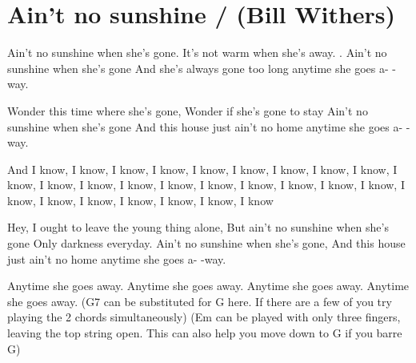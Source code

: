 \section{Ain't no sunshine / (Bill Withers)}\label{sec:ain_t_no_sunshine}
Ain't no sunshine when she's gone. 
It's not warm when she's away. . 
Ain't no sunshine when she's gone
And she's always gone too long anytime she goes a- 
-way.

Wonder this time where she's gone, 
Wonder if she's gone to stay 
Ain't no sunshine when she's gone
And this house just ain't no home anytime she goes a-
-way.

And I know, I know, I know, I know, I know,
I know, I know, I know, I know, I know, I know, I know,
I know, I know, I know, I know, I know, I know,
I know, I know, I know, I know, I know, I know, I know, I
know

Hey, I ought to leave the young thing alone,
But ain't no sunshine when she's gone 
Only  darkness everyday. 
Ain't no sunshine when she's gone,
And this house just ain't no home anytime she goes a-
-way.

Anytime she goes away. 
Anytime she goes away. 
Anytime she goes away. 
Anytime she goes away. 
{\small (G7 can be substituted for G here. If there are a few of you try playing
the 2 chords simultaneously)}
{\small (Em can be played with only three fingers, leaving the top string open.
This can also help you move down to G if you barre G)}
